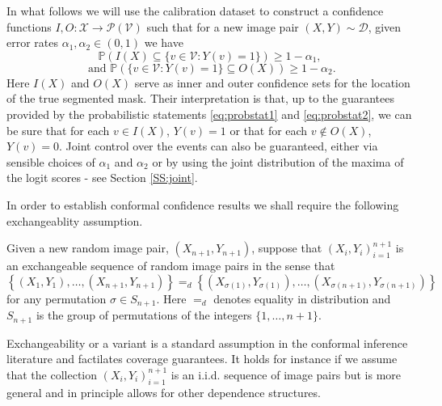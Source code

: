 In what follows we will use the calibration dataset to construct a confidence functions $I,O:  \mathcal{X}  \rightarrow \mathcal{P}(\mathcal{V})$ such that for a new image pair $(X,Y) \sim \mathcal{D}$, given error rates $\alpha_1, \alpha_2 \in (0,1)$ we have
\begin{equation}\label{eq:probstat1}
	\mathbb{P}\left( I(X) \subseteq \lbrace v\in \mathcal{V}: Y(v) = 1 \rbrace  \right) \geq 1 - \alpha_1, 
\end{equation}
\begin{equation}\label{eq:probstat2}
	\text{ and } 	\mathbb{P}\left( \lbrace v\in \mathcal{V}: Y(v) = 1 \rbrace \subseteq O(X)  \right) \geq 1 - \alpha_2.
\end{equation}
Here $I(X)$ and $O(X)$ serve as inner and outer confidence sets for the location of the true segmented mask. Their interpretation is that, up to the guarantees provided by the probabilistic statements \eqref{eq:probstat1} and \eqref{eq:probstat2}, we can be sure that for each $v\in I(X)$, $Y(v) = 1$ or that for each $v \not\in O(X)$, $Y(v) = 0$. Joint control over the events can also be guaranteed, either via sensible choices of $\alpha_1$ and $\alpha_2$ or by using the joint distribution of the maxima of the logit scores - see Section \ref{SS:joint}. 

In order to establish conformal confidence results we shall require the following exchangeablity assumption. 
\begin{assumption}\label{ass:ex}
		Given a new random image pair, $(X_{n+1},Y_{n+1})$, suppose that $(X_i, Y_i)_{i = 1}^{n+1}$ is an exchangeable sequence of random image pairs in the sense that 
	\begin{equation*}
		\left\lbrace (X_1,Y_1), \dots, (X_{n+1}, Y_{n+1}) \right\rbrace =_d \left\lbrace (X_{\sigma(1)}, Y_{\sigma(1)}), \dots, (X_{\sigma(n+1)}, Y_{\sigma(n+1)}) \right\rbrace
	\end{equation*}
	for any permutation $\sigma \in S_{n+1}$. Here $=_d$ denotes equality in distribution and $S_{n+1} $ is the group of permutations of the integers $\lbrace1, \dots, n+1\rbrace$.
\end{assumption}
Exchangeability or a variant is a standard assumption in the conformal inference literature \citep{Angelopoulos2021} and factilates coverage guarantees. It holds for instance if we assume that the collection $(X_i, Y_i)_{i = 1}^{n+1}$ is an i.i.d. sequence of image pairs but is more general and in principle allows for other dependence structures. 

